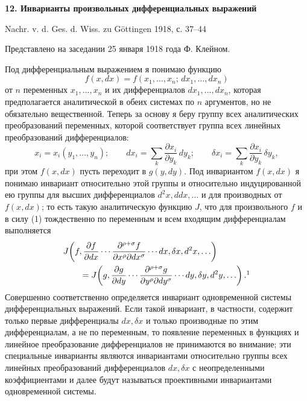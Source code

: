 \documentclass[11pt]{article}
\begin{document}

\begin{center}
{\Large\bfseries 12. Инварианты произвольных дифференциальных выражений}\par
\vspace{1.5em}
Nachr. v. d. Ges. d. Wiss. zu Göttingen 1918, с. 37--44
\end{center}

\vspace{3em}
\begin{center}
Представлено на заседании 25 января 1918 года Ф. Клейном.
\end{center}

Под дифференциальным выражением я понимаю функцию
\[
f(x,dx)=f(x_1,\ldots,x_n;\,dx_1,\ldots,dx_n)
\]
от \(n\) переменных \(x_1,\ldots,x_n\) и их дифференциалов
\(dx_1,\ldots,dx_n\), которая предполагается аналитической в обеих системах по \(n\) аргументов, но не обязательно вещественной. Теперь за основу я беру группу всех аналитических преобразований переменных, которой соответствует группа всех линейных преобразований дифференциалов:
\begin{equation}
x_i=x_i(y_1,\ldots,y_n);\qquad
dx_i=\sum_k\frac{\partial x_i}{\partial y_k}\,dy_k;\qquad
\delta x_i=\sum_k\frac{\partial x_i}{\partial y_k}\,\delta y_k,
\tag{1}
\end{equation}
при этом \(f(x,dx)\) пусть переходит в \(g(y,dy)\). Под инвариантом \(f(x,dx)\) я понимаю инвариант относительно этой группы и относительно индуцированной ею группы для высших дифференциалов \(d^2x,ddx,\ldots\) и для производных от \(f(x,dx)\); то есть такую аналитическую функцию \(J\), что для произвольного \(f\) и в силу (1) тождественно по переменным и всем входящим дифференциалам выполняется
\[
\begin{aligned}
&J\!\left(f,\frac{\partial f}{\partial dx}\cdots
\frac{\partial^{\rho+\sigma}f}{\partial x^\rho\partial dx^\sigma}
\cdots dx,\delta x,d^2x,\ldots\right)\\
&\qquad =
J\!\left(g,\frac{\partial g}{\partial dy}\cdots
\frac{\partial^{\rho+\sigma}g}{\partial y^\rho\partial dy^\sigma}
\cdots dy,\delta y,d^2y,\ldots\right).\footnotemark
\end{aligned}
\]
Совершенно соответственно определяется инвариант одновременной системы дифференциальных выражений. Если такой инвариант, в частности, содержит только первые дифференциалы \(dx,\delta x\) и только производные по этим дифференциалам, а не по переменным, то появление переменных в функциях и линейное преобразование дифференциалов не принимаются во внимание; эти специальные инварианты являются инвариантами относительно группы всех линейных преобразований дифференциалов \(dx,\delta x\) с неопределенными коэффициентами и далее будут называться проективными инвариантами одновременной системы.
\end{document}
